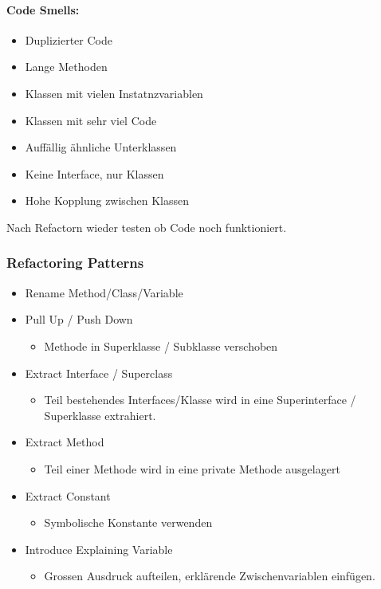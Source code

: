 \documentclass[../ZF_SWEN1.tex]{subfiles}
\begin{document}
\paragraph{Code Smells:}
\begin{itemize}
	\item Duplizierter Code
	\item Lange Methoden
	\item Klassen mit vielen Instatnzvariablen
	\item Klassen mit sehr viel Code
	\item Auffällig ähnliche Unterklassen
	\item Keine Interface, nur Klassen
	\item Hohe Kopplung zwischen Klassen
\end{itemize}


Nach Refactorn wieder testen ob Code noch funktioniert.

\subsubsection{Refactoring Patterns}
\begin{itemize}
	\item Rename Method/Class/Variable
	\item Pull Up / Push Down
	\begin{itemize}
		\item Methode in Superklasse / Subklasse verschoben
	\end{itemize}
	\item Extract Interface / Superclass
	\begin{itemize}
		\item Teil bestehendes Interfaces/Klasse wird in eine Superinterface / Superklasse extrahiert.
	\end{itemize}
	\item Extract Method
	\begin{itemize}
		\item Teil einer Methode wird in eine private Methode ausgelagert
	\end{itemize}
	\item Extract Constant
	\begin{itemize}
		\item Symbolische Konstante verwenden
	\end{itemize}
	\item Introduce Explaining Variable
	\begin{itemize}
		\item Grossen Ausdruck aufteilen, erklärende Zwischenvariablen einfügen.
	\end{itemize}
\end{itemize}
\end{document}
